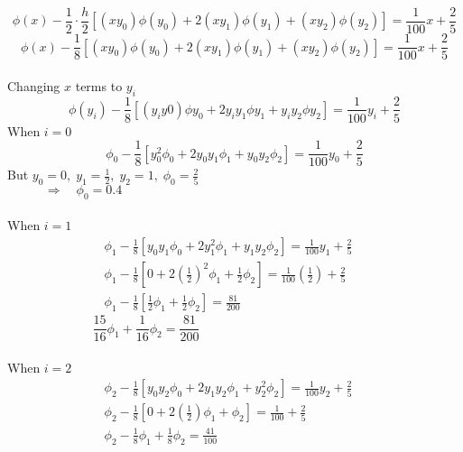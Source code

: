 \documentclass[a4paper,12pt]{report}
\newcommand{\sps}{\\[0.2cm]}
\begin{document}
	\begin{equation*}
	\phi(x) - \frac{1}{2} \cdot \frac{h}{2} \left[ (xy_0) \phi(y_0) + 2(xy_1)\phi(y_1) + (xy_2) \phi(y_2)\right] = \frac{1}{100}x + \frac{2}{5}
	\end{equation*}
	\begin{equation}
		\phi(x) - \frac{1}{8}\left[ (xy_0)\phi(y_0) + 2(xy_1)\phi(y_1) + (xy_2)\phi(y_2)\right] = \frac{1}{100}x + \frac{2}{5} \tag{1} \label{eq:a}
	\end{equation}
	\\Changing $x$ terms to $y_i$
	\begin{equation*}
		\phi(y_i) - \frac{1}{8} \left[ (y_iy0)\phi y_0 + 2y_iy_1\phi y_1 + y_iy_2\phi y_2\right] = \frac{1}{100}y_i + \frac{2}{5}
	\end{equation*}	
	When $i=0$
	\begin{equation*}
		\phi_0 - \frac{1}{8} \left[ y_0^2\phi_0 + 2y_0y_1\phi_1 + y_0y_2\phi_2\right] = \frac{1}{100}y_0 + \frac{2}{5}
	\end{equation*}	
	But $y_0 = 0, \; y_1 = \frac{1}{2}, \; y_2=1, \; \phi_0 = \frac{2}{5}$
	\begin{equation}
		\Rightarrow \quad\phi_0 = 0.4 \quad \quad \quad \quad \quad \quad \quad \quad \quad\quad \quad \quad\quad \quad \quad\quad \quad \quad\quad \quad \quad\quad \quad \quad\tag{i} \label{eq:b}
	\end{equation}
	\\When $i=1$
	\begin{eqnarray*}
		\phi_1 - \frac{1}{8} \left[ y_0y_1\phi_0 + 2y_1^2 \phi_1 + y_1y_2\phi_2\right] = \frac{1}{100}y_1 + \frac{2}{5}\quad\sps
			\phi_1 - \frac{1}{8} \left[ 0 + 2\left(\frac{1}{2}\right)^2 \phi_1 + \frac{1}{2}\phi_2\right] = \frac{1}{100}\left(\frac{1}{2}\right) + \frac{2}{5}\sps
			\phi_1 - \frac{1}{8} \left[\frac{1}{2} \phi_1 + \frac{1}{2}\phi_2\right] = \frac{81}{200}\quad\quad\quad\quad\quad\quad\quad\quad\quad
	\end{eqnarray*}
	\begin{equation}
		\frac{15}{16} \phi_1 + \frac{1}{16}\phi_2 = \frac{81}{200}\quad\quad\quad\quad\quad\quad\quad\quad\quad\quad\quad\quad\quad\quad \tag{ii} \label{eq:c}
	\end{equation}
	\\When $i=2$
	\begin{eqnarray*}
		\phi_2 - \frac{1}{8} \left[ y_0y_2\phi_0 + 2y_1y_2 \phi_1 + y_2^2\phi_2\right] = \frac{1}{100}y_2 + \frac{2}{5}\quad\sps
		\phi_2 - \frac{1}{8} \left[ 0 + 2\left(\frac{1}{2}\right) \phi_1 + \phi_2\right] = \frac{1}{100} + \frac{2}{5}\quad\quad\quad\quad\sps
		\phi_2 - \frac{1}{8}\phi_1 + \frac{1}{8}\phi_2 = \frac{41}{100}\quad\quad \;\quad\quad\quad\quad\quad\quad\quad\quad\quad
	\end{eqnarray*}
\end{document}

